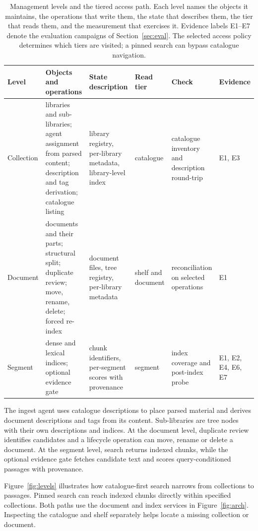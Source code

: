 \begin{table}[t]
\centering
\small
\setlength{\tabcolsep}{4pt}
\renewcommand{\arraystretch}{1.15}
\caption{ Management levels and the tiered access path. Each level names the
objects it maintains, the operations that write them, the state that describes
them, the tier that reads them, and the measurement that exercises it.
Evidence labels E1--E7 denote the evaluation campaigns of
Section~\ref{sec:eval}. The selected access policy determines which tiers are
visited; a pinned search can bypass catalogue navigation.}
\label{tab:levels}
\begin{tabular}{@{}>{\raggedright\arraybackslash}p{}>{\raggedright\arraybackslash}p{}>{\raggedright\arraybackslash}p{}>{\raggedright\arraybackslash}p{}>{\raggedright\arraybackslash}p{}>{\raggedright\arraybackslash}p{}@{}}
\toprule
Level & Objects and operations & State description & Read tier & Check & Evidence\\
\midrule
Collection & libraries and sub-libraries; agent assignment from parsed content; description and tag derivation; catalogue listing & library registry, per-library metadata, library-level index & catalogue & catalogue inventory and description round-trip & E1, E3\\
Document & documents and their parts; structural split; duplicate review; move, rename, delete; forced re-index & document files, tree registry, per-library metadata & shelf and document & reconciliation on selected operations & E1\\
Segment & dense and lexical indices; optional evidence gate & chunk identifiers, per-segment scores with provenance & segment & index coverage and post-index probe & E1, E2, E4, E6, E7\\
\bottomrule
\end{tabular}
\end{table}

The ingest agent uses catalogue descriptions to place parsed material and
derives document descriptions and tags from its content. Sub-libraries are
tree nodes with their own descriptions and indices. At the document level,
duplicate review identifies candidates and a lifecycle operation can move,
rename or delete a document. At the segment level, search returns indexed
chunks, while the optional evidence gate fetches candidate text and scores
query-conditioned passages with provenance.

 Figure~\ref{fig:levels} illustrates how catalogue-first search narrows
from collections to passages. Pinned search can reach indexed chunks
directly within specified collections. Both paths use the document and
index services in Figure~\ref{fig:arch}. Inspecting the catalogue and
shelf separately helps locate a missing collection or document.

